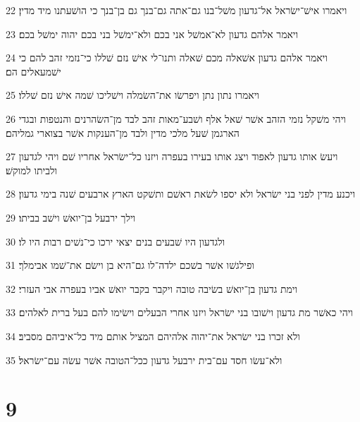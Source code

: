 \par 22 ויאמרו אישׁ־ישׂראל אל־גדעון משׁל־בנו גם־אתה גם־בנך גם בן־בנך כי הושׁעתנו מיד מדין׃
\par 23 ויאמר אלהם גדעון לא־אמשׁל אני בכם ולא־ימשׁל בני בכם יהוה ימשׁל בכם׃
\par 24 ויאמר אלהם גדעון אשׁאלה מכם שׁאלה ותנו־לי אישׁ נזם שׁללו כי־נזמי זהב להם כי ישׁמעאלים הם׃
\par 25 ויאמרו נתון נתן ויפרשׂו את־השׂמלה וישׁליכו שׁמה אישׁ נזם שׁללו׃
\par 26 ויהי משׁקל נזמי הזהב אשׁר שׁאל אלף ושׁבע־מאות זהב לבד מן־השׂהרנים והנטפות ובגדי הארגמן שׁעל מלכי מדין ולבד מן־הענקות אשׁר בצוארי גמליהם׃
\par 27 ויעשׂ אותו גדעון לאפוד ויצג אותו בעירו בעפרה ויזנו כל־ישׂראל אחריו שׁם ויהי לגדעון ולביתו למוקשׁ׃
\par 28 ויכנע מדין לפני בני ישׂראל ולא יספו לשׂאת ראשׁם ותשׁקט הארץ ארבעים שׁנה בימי גדעון׃
\par 29 וילך ירבעל בן־יואשׁ וישׁב בביתו׃
\par 30 ולגדעון היו שׁבעים בנים יצאי ירכו כי־נשׁים רבות היו לו׃
\par 31 ופילגשׁו אשׁר בשׁכם ילדה־לו גם־היא בן וישׂם את־שׁמו אבימלך׃
\par 32 וימת גדעון בן־יואשׁ בשׂיבה טובה ויקבר בקבר יואשׁ אביו בעפרה אבי העזרי׃
\par 33 ויהי כאשׁר מת גדעון וישׁובו בני ישׂראל ויזנו אחרי הבעלים וישׂימו להם בעל ברית לאלהים׃
\par 34 ולא זכרו בני ישׂראל את־יהוה אלהיהם המציל אותם מיד כל־איביהם מסביב׃
\par 35 ולא־עשׂו חסד עם־בית ירבעל גדעון ככל־הטובה אשׁר עשׂה עם־ישׂראל׃

\chapter{9}

